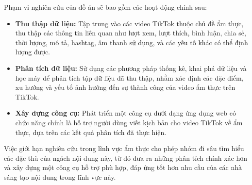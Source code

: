 Phạm vi nghiên cứu của đồ án sẽ bao gồm các hoạt động chính sau:
\begin{itemize}
    \item \textbf{Thu thập dữ liệu:} Tập trung vào các video TikTok thuộc chủ đề ẩm thực, thu thập các thông tin liên quan như lượt xem, lượt thích, bình luận, chia sẻ, thời lượng, mô tả, hashtag, âm thanh sử dụng, và các yếu tố khác có thể định lượng được.
    
    \item \textbf{Phân tích dữ liệu:} Sử dụng các phương pháp thống kê, khai phá dữ liệu và học máy để phân tích tập dữ liệu đã thu thập, nhằm xác định các đặc điểm, xu hướng và yếu tố ảnh hưởng đến sự thành công của video ẩm thực trên TikTok.
    
    \item \textbf{Xây dựng công cụ:} Phát triển một công cụ dưới dạng ứng dụng web có chức năng chính là hỗ trợ người dùng viết kịch bản cho video TikTok về ẩm thực, dựa trên các kết quả phân tích đã thực hiện.
\end{itemize}

Việc giới hạn nghiên cứu trong lĩnh vực ẩm thực cho phép nhóm đi sâu tìm hiểu các đặc thù của ngách nội dung này, từ đó đưa ra những phân tích chính xác hơn và xây dựng một công cụ hỗ trợ phù hợp, đáp ứng tốt hơn nhu cầu của các nhà sáng tạo nội dung trong lĩnh vực này.
